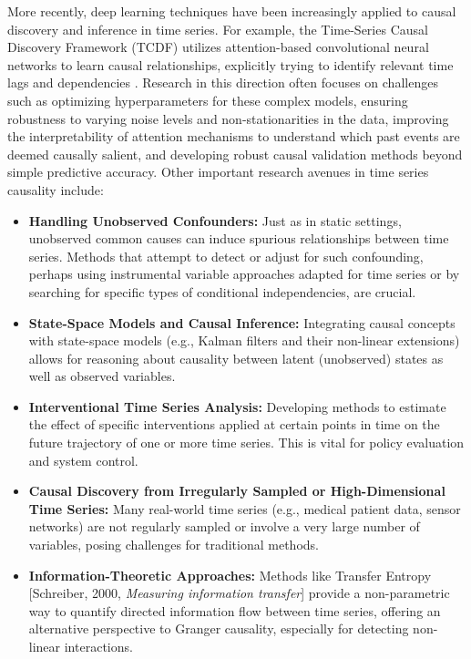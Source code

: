 {More recently, deep learning techniques have been increasingly applied to causal discovery and inference in time series. For example, the Time-Series Causal Discovery Framework (TCDF) utilizes attention-based convolutional neural networks to learn causal relationships, explicitly trying to identify relevant time lags and dependencies \cite{Nauta2019Causal}. Research in this direction often focuses on challenges such as optimizing hyperparameters for these complex models, ensuring robustness to varying noise levels and non-stationarities in the data, improving the interpretability of attention mechanisms to understand which past events are deemed causally salient, and developing robust causal validation methods beyond simple predictive accuracy. Other important research avenues in time series causality include:
\begin{itemize}
    \item \textbf{Handling Unobserved Confounders:} Just as in static settings, unobserved common causes can induce spurious relationships between time series. Methods that attempt to detect or adjust for such confounding, perhaps using instrumental variable approaches adapted for time series or by searching for specific types of conditional independencies, are crucial.
    \item \textbf{State-Space Models and Causal Inference:} Integrating causal concepts with state-space models (e.g., Kalman filters and their non-linear extensions) allows for reasoning about causality between latent (unobserved) states as well as observed variables.
    \item \textbf{Interventional Time Series Analysis:} Developing methods to estimate the effect of specific interventions applied at certain points in time on the future trajectory of one or more time series. This is vital for policy evaluation and system control.
    \item \textbf{Causal Discovery from Irregularly Sampled or High-Dimensional Time Series:} Many real-world time series (e.g., medical patient data, sensor networks) are not regularly sampled or involve a very large number of variables, posing challenges for traditional methods.
    \item \textbf{Information-Theoretic Approaches:} Methods like Transfer Entropy [Schreiber, 2000, \textit{Measuring information transfer}] provide a non-parametric way to quantify directed information flow between time series, offering an alternative perspective to Granger causality, especially for detecting non-linear interactions.
\end{itemize}

}
